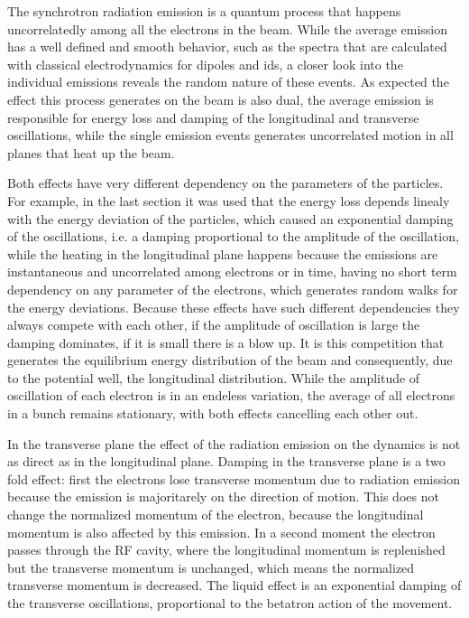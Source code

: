     The synchrotron radiation emission is a quantum process that happens uncorrelatedly among all the electrons in the beam. While the average emission has a well defined and smooth behavior, such as the spectra that are calculated with classical electrodynamics for dipoles and \gls{ids}, a closer look into the individual emissions reveals the random nature of these events. As expected the effect this process generates on the beam is also dual, the average emission is responsible for energy loss and damping of the longitudinal and transverse oscillations, while the single emission events generates uncorrelated motion in all planes that heat up the beam.

    Both effects have very different dependency on the parameters of the particles. For example, in the last section it was used that the energy loss depends linealy with the energy deviation of the particles, which caused an exponential damping of the oscillations, i.e. a damping proportional to the amplitude of the oscillation, while the heating in the longitudinal plane happens because the emissions are instantaneous and uncorrelated among electrons or in time, having no short term dependency on any parameter of the electrons, which generates random walks for the energy deviations. Because these effects have such different dependencies they always compete with each other, if the amplitude of oscillation is large the damping dominates, if it is small there is a blow up. It is this competition that generates the equilibrium energy distribution of the beam and consequently, due to the potential well, the longitudinal distribution. While the amplitude of oscillation of each electron is in an endeless variation, the average of all electrons in a bunch remains stationary, with both effects cancelling each other out.

    In the transverse plane the effect of the radiation emission on the dynamics is not as direct as in the longitudinal plane. Damping in the transverse plane is a two fold effect: first the electrons lose transverse momentum due to radiation emission because the emission is majoritarely on the direction of motion. This does not change the normalized momentum of the electron, because the longitudinal momentum is also affected by this emission. In a second moment the electron passes through the RF cavity, where the longitudinal momentum is replenished but the transverse momentum is unchanged, which means the normalized transverse momentum is decreased. The liquid effect is an exponential damping of the transverse oscillations, proportional to the betatron action of the movement.

